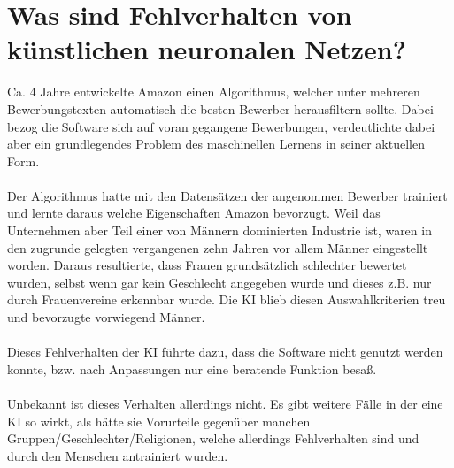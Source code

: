 \documentclass[12pt,oneside,a4paper,parskip]{scrbook}
\begin{document}
\section{Was sind Fehlverhalten von künstlichen neuronalen Netzen?}
\label{section:KIBias}
Ca. 4 Jahre entwickelte Amazon einen Algorithmus, welcher unter mehreren Bewerbungstexten automatisch die besten Bewerber herausfiltern sollte. Dabei bezog die Software sich auf voran gegangene Bewerbungen, verdeutlichte dabei aber ein grundlegendes Problem des maschinellen Lernens in seiner aktuellen Form.\\\\
Der Algorithmus hatte mit den Datensätzen der angenommen Bewerber trainiert und lernte daraus welche Eigenschaften Amazon bevorzugt. Weil das Unternehmen aber Teil einer von Männern dominierten Industrie ist, waren in den zugrunde gelegten vergangenen zehn Jahren vor allem Männer eingestellt worden. Daraus resultierte, dass Frauen grundsätzlich schlechter bewertet wurden, selbst wenn gar kein Geschlecht angegeben wurde und dieses z.B. nur durch Frauenvereine erkennbar wurde. Die KI blieb diesen Auswahlkriterien treu und bevorzugte vorwiegend Männer.\cite{amazon} \\\\
Dieses Fehlverhalten der KI führte dazu, dass die Software nicht genutzt werden konnte, bzw. nach Anpassungen nur eine beratende Funktion besaß.
\\\\
Unbekannt ist dieses Verhalten allerdings nicht. Es gibt weitere Fälle in der eine KI so wirkt, als hätte sie Vorurteile gegenüber manchen Gruppen/Geschlechter/Religionen, welche allerdings Fehlverhalten sind und durch den Menschen antrainiert wurden.
\end{document}
